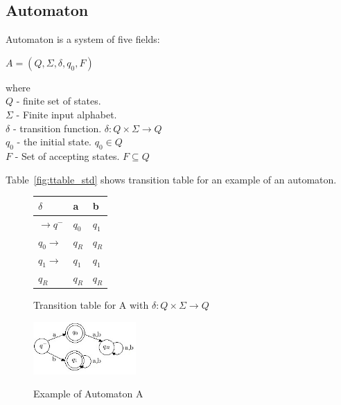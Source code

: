 \documentclass[runningheads, a4paper]{llncs}
\begin{document}
\subsection{Automaton} \label{sec:autom}
\begin{definition}
Automaton is a system of five fields:
\begin{center}
	$A = (Q, \Sigma, \delta, q_0, F)$
\end{center}

where \\
$Q$ - finite set of states. \\
$\Sigma$ - Finite input alphabet. \\
$\delta$ - transition function. $\delta: Q \times \Sigma \rightarrow Q$ \\
$q_0$ - the initial state. $q_0 \in Q$ \\
$F$ - Set of accepting states. $F \subseteq Q$ \\
\end{definition}

Table~\ref{fig:ttable_std} shows transition table for an example of an automaton.

%
%
\begin{figure}
\CenterFloatBoxes
\begin{floatrow}

\ttabbox
  {
  \centering
  \setlength{\tabcolsep}{15pt}
	\renewcommand{\arraystretch}{1.5}
	\begin{tabular}{|P{1.0cm} || P{0.6cm} | P{0.6cm} |}
	\hline
	$\delta$ & a & b \\
	\hline
	\hline
	$\rightarrow q^-$ 		& $q_0$ & $q_1$ \\
	\hline
	$q_0 \rightarrow$ 		& $q_R$ & $q_R$ \\
	\hline
	$q_1 \rightarrow$ 		& $q_1$ & $q_1$ \\
	\hline
	$q_R$  					& $q_R$ & $q_R$ \\
	\hline
	\end{tabular}
  }
  {\caption{Transition table for A with $\delta: Q \times \Sigma \rightarrow Q$}\label{fig:ttable_std}}

\ffigbox
  {\includegraphics[width=0.35\textwidth]{res/automaton_example.jpg}}
  {\caption{Example of Automaton A}\label{fig:automaton_ex}}
\killfloatstyle

\end{floatrow}
\end{figure}
\end{document}
